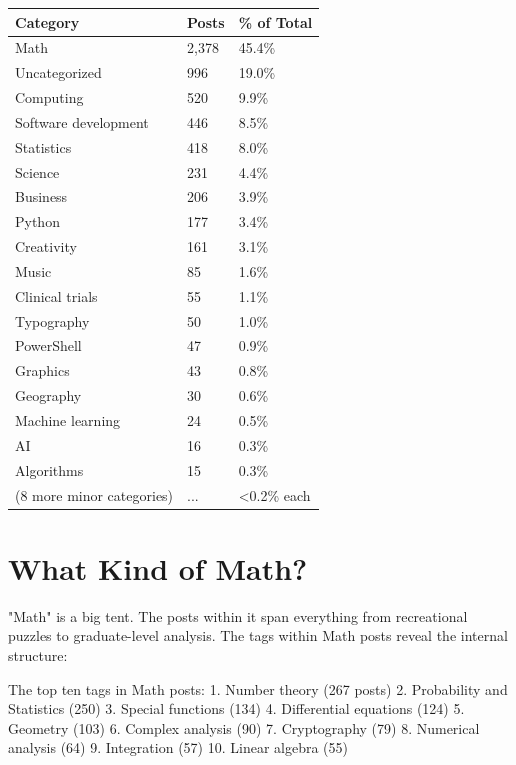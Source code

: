 \begin{center}
\begin{tabular}{lll}
\toprule
\textbf{Category} & \textbf{Posts} & \textbf{\% of Total} \\
\midrule
Math & 2,378 & 45.4\% \\
Uncategorized & 996 & 19.0\% \\
Computing & 520 & 9.9\% \\
Software development & 446 & 8.5\% \\
Statistics & 418 & 8.0\% \\
Science & 231 & 4.4\% \\
Business & 206 & 3.9\% \\
Python & 177 & 3.4\% \\
Creativity & 161 & 3.1\% \\
Music & 85 & 1.6\% \\
Clinical trials & 55 & 1.1\% \\
Typography & 50 & 1.0\% \\
PowerShell & 47 & 0.9\% \\
Graphics & 43 & 0.8\% \\
Geography & 30 & 0.6\% \\
Machine learning & 24 & 0.5\% \\
AI & 16 & 0.3\% \\
Algorithms & 15 & 0.3\% \\
(8 more minor categories) & ... & <0.2\% each \\
\bottomrule
\end{tabular}
\end{center}


\bigskip

\section*{What Kind of Math?}

"Math" is a big tent. The posts within it span everything from recreational puzzles to graduate-level analysis. The tags within Math posts reveal the internal structure:

The top ten tags in Math posts:
1. Number theory (267 posts)
2. Probability and Statistics (250)
3. Special functions (134)
4. Differential equations (124)
5. Geometry (103)
6. Complex analysis (90)
7. Cryptography (79)
8. Numerical analysis (64)
9. Integration (57)
10. Linear algebra (55)

